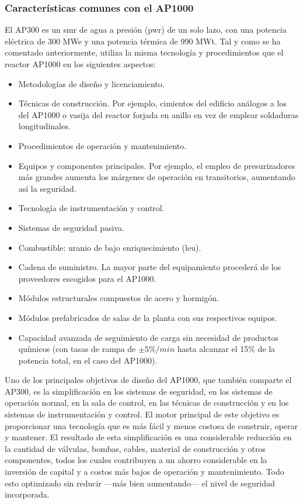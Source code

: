 \subsubsection{Características comunes con el AP1000}

El AP300 es un \acrshort{smr} de agua a presión (\acrshort{pwr}) de un solo lazo, con una potencia eléctrica de 300 MWe y una potencia térmica de 990 MWt. Tal y como se ha comentado anteriormente, utiliza la misma tecnología y procedimientos que el reactor AP1000 en los siguientes aspectos: 

\begin{itemize}
  \item Metodologías de diseño y licenciamiento.
  \item Técnicas de construcción. Por ejemplo, cimientos del edificio análogos a los del AP1000 o vasija del reactor forjada en anillo en vez de emplear soldaduras longitudinales.
  \item Procedimientos de operación y mantenimiento.
  \item Equipos y componentes principales. Por ejemplo, el empleo de presurizadores más grandes aumenta los márgenes de operación en transitorios, aumentando así la seguridad.
  \item Tecnología de instrumentación y control.
  \item Sistemas de seguridad pasiva.
  \item Combustible: uranio de bajo enriquecimiento (\acrshort{leu}).
  \item Cadena de suministro. La mayor parte del equipamiento procederá de los proveedores escogidos para el AP1000.
  \item Módulos estructurales compuestos de acero y hormigón.
  \item Módulos prefabricados de salas de la planta con sus respectivos equipos.
  \item Capacidad avanzada de seguimiento de carga sin necesidad de productos químicos (con tasas de rampa de $\pm5\%/min$ hasta alcanzar el 15\% de la potencia total, en el caso del AP1000).
\end{itemize}
Uno de los principales objetivos de diseño del AP1000, que también comparte el AP300, es la simplificación en los sistemas de seguridad, en los sistemas de operación normal, en la sala de control, en las técnicas de construcción y en los sistemas de instrumentación y control. El motor principal de este objetivo es proporcionar una tecnología que es más fácil y menos costosa de construir, operar y mantener. El resultado de esta simplificación es una considerable reducción en la cantidad de válvulas, bombas, cables, material de construcción y otros componentes, todos los cuales contribuyen a un ahorro considerable en la inversión de capital y a costos más bajos de operación y mantenimiento. Todo esto optimizado sin reducir ---más bien aumentando--- el nivel de seguridad incorporada.

